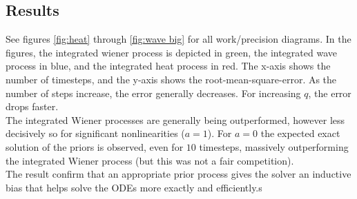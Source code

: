 \subsection*{Results}
See figures \ref{fig:heat} through \ref{fig:wave big} for all work/precision diagrams. In the figures, the integrated wiener process is depicted in green, the integrated wave process in blue, and the integrated heat process in red. The x-axis shows the number of timesteps, and the y-axis shows the root-mean-square-error. As the number of steps increase, the error generally decreases. For increasing $q$, the error drops faster.
\\ The integrated Wiener processes are generally being outperformed, however less decisively so for significant nonlinearities ($a = 1$). For $a=0$ the expected exact solution of the priors is observed, even for $10$ timesteps, massively outperforming the integrated Wiener process (but this was not a fair competition).
\\ The result confirm that an appropriate prior process gives the solver an inductive bias that helps solve the ODEs more exactly and efficiently.s
